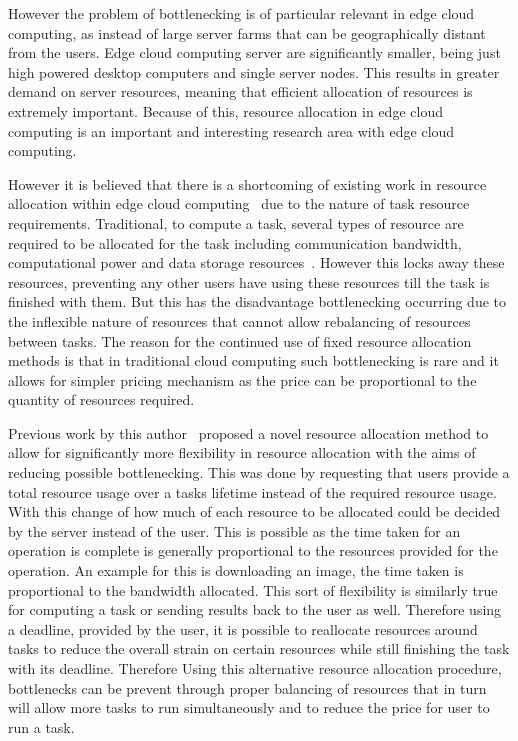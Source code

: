 However the problem of bottlenecking is of particular relevant in edge cloud computing, as instead of large server farms
that can be geographically distant from the users. Edge cloud computing server are significantly smaller,
being just high powered desktop computers and single server nodes. This results in greater demand on server resources,
meaning that efficient allocation of resources is extremely important. Because of this, resource allocation in edge
cloud computing is an important and interesting research area with edge cloud computing.

However it is believed that there is a shortcoming of existing work in resource allocation within
edge cloud computing~\citep{vaji_infocom, Bi2019} due to the nature of task resource requirements. Traditional, to
compute a task, several types of resource are required to be allocated for the task including communication bandwidth,
computational power and data storage resources~\citep{vaji_infocom}.
However this locks away these resources, preventing any other users have using these resources till the task is
finished with them. But this has the disadvantage bottlenecking occurring due to the inflexible
nature of resources that cannot allow rebalancing of resources between tasks. The reason for the continued use of fixed
resource allocation methods is that in traditional cloud computing such bottlenecking is rare and it allows for
simpler pricing mechanism as the price can be proportional to the quantity of resources required.

Previous work by this author~\citep{FlexibleResourceAllocation} proposed a novel resource allocation method to allow
for significantly more flexibility in resource allocation with the aims of reducing possible bottlenecking. This was
done by requesting that users provide a total resource usage over a tasks lifetime instead of the required resource
usage. With this change of how much of each resource to be allocated could be decided by the server instead of the user.
This is possible as the time taken for an operation is complete is generally proportional to the resources provided
for the operation. An example for this is downloading an image, the time taken is proportional to the bandwidth
allocated. This sort of flexibility is similarly true for computing a task or sending results back to the user as well.
Therefore using a deadline, provided by the user, it is possible to reallocate resources around tasks to reduce the
overall strain on certain resources while still finishing the task with its deadline. Therefore Using this alternative
resource allocation procedure, bottlenecks can be prevent through proper balancing of resources that in turn will allow
more tasks to run simultaneously and to reduce the price for user to run a task.


